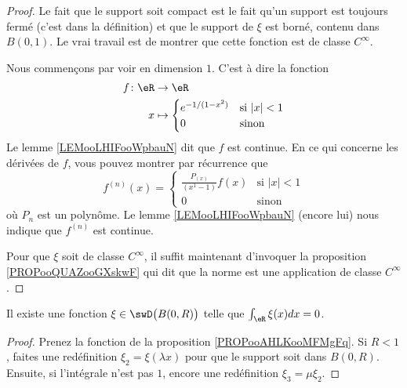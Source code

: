 \begin{proof}
    Le fait que le support soit compact est le fait qu'un support est toujours fermé (c'est dans la définition) et que le support de \( \xi\) est borné, contenu dans \( B(0,1)\). Le vrai travail est de montrer que cette fonction est de classe \(  C^{\infty}\).

    Nous commençons par voir en dimension \( 1\). C'est à dire la fonction
    \begin{equation}
        \begin{aligned}
            f\colon \eR&\to \eR \\
            x&\mapsto \begin{cases}
                e^{-1/(1-x^2)}    &   \text{si } | x |<1\\
                0    &    \text{sinon }
            \end{cases}
        \end{aligned}
    \end{equation}
    Le lemme \ref{LEMooLHIFooWpbauN} dit que \( f\) est continue. En ce qui concerne les dérivées de \( f\), vous pouvez montrer par récurrence que
    \begin{equation}
        f^{(n)}(x)=\begin{cases}
            \frac{ P_(x) }{ (x^1-1) }f(x)    &   \text{si } | x |<1\\
            0    &    \text{sinon }
        \end{cases}
    \end{equation}
    où \( P_n\) est un polynôme. Le lemme \ref{LEMooLHIFooWpbauN} (encore lui) nous indique que \( f^{(n)}\) est continue.

    Pour que \( \xi\) soit de classe \(  C^{\infty}\), il suffit maintenant d'invoquer la proposition \ref{PROPooQUAZooGXskwF} qui dit que la norme est une application de classe \(  C^{\infty}\).
\end{proof}

\begin{corollary}       \label{CORooHHZXooXmwGmC}
	Il existe une fonction \( \xi\in\swD\big( B(0,R) \big)\) telle que \( \int_{\eR}\xi(x)dx=0\).
\end{corollary}

\begin{proof}
	Prenez la fonction de la proposition \ref{PROPooAHLKooMFMgFq}. Si \( R<1\), faites une redéfinition \( \xi_2=\xi(\lambda x)\) pour que le support soit dans \( B(0,R)\). Ensuite, si l'intégrale n'est pas \( 1\), encore une redéfinition \( \xi_3=\mu\xi_2\).
\end{proof}

